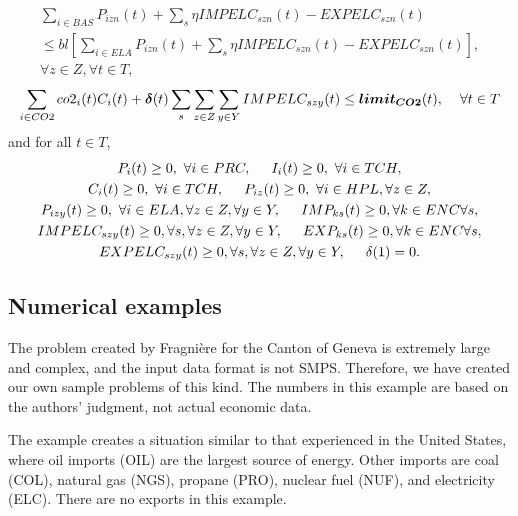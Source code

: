 \begin{multline*}
\sum_{i\in BAS} P_{izn}(t) + \sum_s \eta IMPELC_{szn}(t) - EXPELC_{szn}(t) \\
\leq bl\left[ \sum_{i\in ELA} P_{izn}(t) + \sum_s \eta IMPELC_{szn}(t) - EXPELC_{szn}(t) \right],\\
\forall z \in Z, \forall t\in T,
\end{multline*}
\begin{equation*}
\sum_{i\in CO2} co2_i(t) C_i(t) + \mathbf{\boldsymbol{\delta}}(t) \sum_s \sum_{z\in Z} \sum_{y\in Y}IMPELC_{szy}(t)\leq \mathbf{\boldsymbol{limit_{CO2}}}(t), \hspace{0.4cm} \forall t\in T
\end{equation*}
and for all $t\in T$,
\begin{multline*}
P_i(t) \geq 0,\ \forall i\in PRC, \hspace{0.5cm} I_i(t) \geq 0,\ \forall i\in TCH,\\
C_i(t) \geq 0,\ \forall i\in TCH, \hspace{0.5cm} P_{iz}(t) \geq 0,\ \forall i\in HPL, \forall z\in Z,\\
P_{izy}(t) \geq 0,\ \forall i\in ELA, \forall z\in Z, \forall y\in Y, \hspace{0.5cm} IMP_{ks}(t) \geq 0, \forall k\in ENC \forall s,\\
IMPELC_{szy}(t) \geq 0, \forall s, \forall z\in Z, \forall y\in Y, \hspace{0.5cm} EXP_{ks}(t) \geq 0, \forall k\in ENC \forall s,\\
EXPELC_{szy}(t) \geq 0, \forall s, \forall z\in Z, \forall y\in Y, \hspace{0.5cm} \delta(1)=0.
\end{multline*}


\subsection{Numerical examples}
\label{ENV:numex}

The problem created by Fragni\`{e}re \cite{fragniere95} for the Canton of Geneva is extremely large and complex, and the input data format is not SMPS.  Therefore, we have created our own sample problems of this kind.  The numbers in this example are based on the authors' judgment, not actual economic data.

The example creates a situation similar to that experienced in the United States, where oil imports (OIL) are the largest source of energy.  Other imports are coal (COL), natural gas (NGS), propane (PRO), nuclear fuel (NUF), and electricity (ELC).  There are no exports in this example.  

